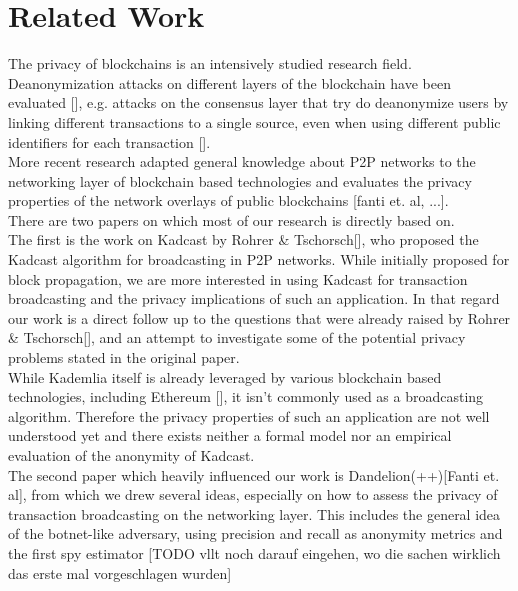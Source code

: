 \section{Related Work}
The privacy of blockchains is an intensively studied research field.
Deanonymization attacks on different layers of the blockchain have been evaluated [],
e.g. attacks on the consensus layer that try do deanonymize users by linking
different transactions to a single source, even when using different public
identifiers for each transaction []. \\
More recent research adapted general knowledge about P2P networks to the networking layer
of blockchain based technologies and evaluates the privacy properties of the
network overlays of public blockchains [fanti et. al, ...]. \\

There are two papers on which most of our research is directly based on. \\
The first is the work on Kadcast by Rohrer \& Tschorsch[], who proposed the Kadcast
algorithm for broadcasting in P2P networks. While initially proposed for block propagation,
we are more interested in using Kadcast for transaction broadcasting and the privacy implications of such an application.
In that regard our work is a direct follow up to the questions that were
already raised by Rohrer \& Tschorsch[],
and an attempt to investigate some of the potential privacy problems
stated in the original paper. \\
While Kademlia itself is already leveraged by various blockchain based technologies, including Ethereum [],
it isn't commonly used as a broadcasting algorithm. Therefore the privacy properties of such an application
are not well understood yet and there exists neither a formal model nor an empirical evaluation of
the anonymity of Kadcast. \\
The second paper which heavily influenced our work is Dandelion(++)[Fanti et. al], from which we
drew several ideas, especially on how to assess the privacy of transaction broadcasting on the
networking layer. This includes the general idea of the botnet-like
adversary, using precision and recall as anonymity metrics and the first
spy estimator [TODO vllt noch darauf eingehen, wo die sachen wirklich
das erste mal vorgeschlagen wurden]





